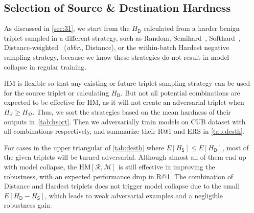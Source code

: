 \documentclass[10pt,twocolumn,letterpaper]{article}
\begin{document}
\begin{comment}
%
In this section, we first carry out parameter search for the components of the
proposed method, in order to illustrate their effectiveness.
%
The comparison with the state-of-the-art DML defense methods will be presented in the end.
%
\end{comment}

\subsection{Selection of Source \& Destination Hardness}
\label{sec:41}






As discussed in \cref{sec:31}, we start from the $H_\mathsf{D}$ calculated from
a harder benign triplet sampled in a different strategy, such as Random,
Semihard~\cite{facenet}, Softhard~\cite{revisiting},
Distance-weighted~\cite{distance} (\emph{abbr}., Distance), or the within-batch
Hardest negative sampling strategy, because we know these strategies do not
result in model collapse in regular training.


HM is flexible so that any existing or future triplet sampling strategy
can be used for the source triplet or calculating $H_\mathsf{D}$.
%
But not all potential combinations are expected to be effective for HM, as it
will not create an adversarial triplet when $H_\mathcal{S}\geqslant
H_\mathcal{D}$.
%
Thus, we sort the strategies based on the mean hardness of their
outputs in~\cref{tab:hsort}.
%
Then we adversarially train models on CUB dataset with all combinations
respectively, and summarize their R@1 and ERS in \cref{tab:desth}.



For cases in the upper triangular of \cref{tab:desth} where $E[H_\mathsf{S}]
\leqslant E[H_\mathsf{D}]$, most of the given triplets will be turned
adversarial.
%
Although almost all of them end up with model collapse, the
$\text{HM}[\mathcal{R},\mathcal{M}]$ is still effective in improving the
robustness, with an expected performance drop in R@1.
%
The combination of Distance and Hardest triplets does not trigger model
collapse due to the small $E[H_\mathsf{D}-H_\mathsf{S}]$, which leads to weak
adversarial examples and a negligible robustness gain.
\end{document}
